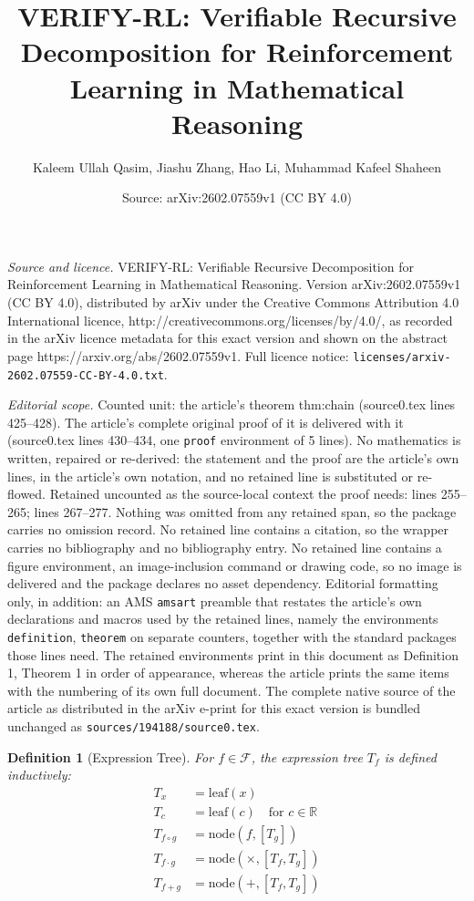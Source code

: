\documentclass[10pt,a4paper]{amsart}
\title{VERIFY-RL: Verifiable Recursive Decomposition for Reinforcement Learning in Mathematical Reasoning}
\author{Kaleem Ullah Qasim, Jiashu Zhang, Hao Li, Muhammad Kafeel Shaheen}
\date{Source: arXiv:2602.07559v1 (CC BY 4.0)}
\newtheorem{definition}{Definition}
\begin{document}
\maketitle

\noindent\emph{Source and licence.} VERIFY-RL: Verifiable Recursive Decomposition for Reinforcement Learning in Mathematical Reasoning. Version arXiv:2602.07559v1 (CC BY 4.0), distributed by arXiv under the Creative Commons Attribution 4.0 International licence, http://creativecommons.org/licenses/by/4.0/, as recorded in the arXiv licence metadata for this exact version and shown on the abstract page https://arxiv.org/abs/2602.07559v1. Full licence notice: \texttt{licenses/arxiv-2602.07559-CC-BY-4.0.txt}.\par\smallskip

\noindent\textit{Editorial scope.} Counted unit: the article's theorem thm:chain (source0.tex lines 425--428). The article's complete original proof of it is delivered with it (source0.tex lines 430--434, one \texttt{proof} environment of 5 lines). No mathematics is written, repaired or re-derived: the statement and the proof are the article's own lines, in the article's own notation, and no retained line is substituted or re-flowed.  Retained uncounted as the source-local context the proof needs: lines 255--265; lines 267--277.  Nothing was omitted from any retained span, so the package carries no omission record.  No retained line contains a citation, so the wrapper carries no bibliography and no bibliography entry.  No retained line contains a figure environment, an image-inclusion command or drawing code, so no image is delivered and the package declares no asset dependency.  Editorial formatting only, in addition: an AMS \texttt{amsart} preamble that restates the article's own declarations and macros used by the retained lines, namely the environments \texttt{definition}, \texttt{theorem} on separate counters, together with the standard packages those lines need.  The retained environments print in this document as Definition 1, Theorem 1 in order of appearance, whereas the article prints the same items with the numbering of its own full document.  The complete native source of the article as distributed in the arXiv e-print for this exact version is bundled unchanged as \texttt{sources/194188/source0.tex}.
\begin{definition}[Expression Tree]
\label{def:expr_tree}
For $f \in \mathcal{F}$, the expression tree $T_f$ is defined inductively:
\begin{align}
T_x &= \text{leaf}(x) \\
T_c &= \text{leaf}(c) \quad \text{for } c \in \mathbb{R} \\
T_{f \circ g} &= \text{node}(f, [T_g]) \\
T_{f \cdot g} &= \text{node}(\times, [T_f, T_g]) \\
T_{f + g} &= \text{node}(+, [T_f, T_g])
\end{align}
\end{definition}
\end{document}
